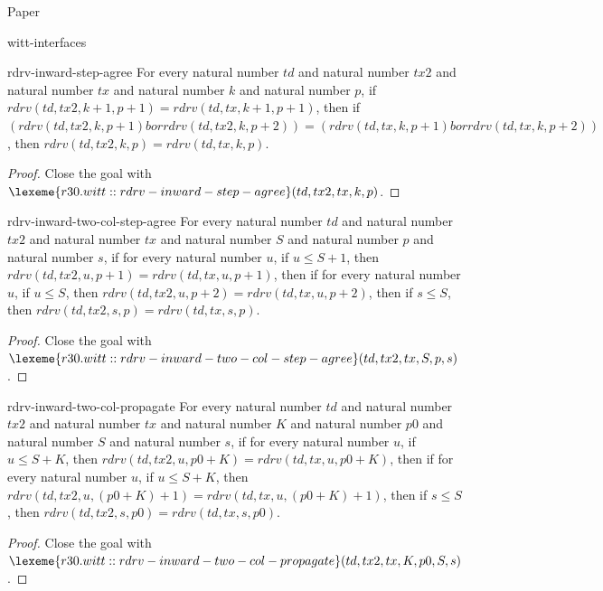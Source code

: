 \begin{lexlean}{Paper}
\begin{section}{witt-interfaces}
  \begin{theorem}{rdrv-inward-step-agree}
  For every natural number \(td\) and natural number \(tx2\) and natural number \(tx\) and natural number \(k\) and natural number \(p\), if \(rdrv(td, tx2, k + 1, p + 1) = rdrv(td, tx, k + 1, p + 1)\), then if \((rdrv(td, tx2, k, p + 1) bor rdrv(td, tx2, k, p + 2)) = (rdrv(td, tx, k, p + 1) bor rdrv(td, tx, k, p + 2))\), then \(rdrv(td, tx2, k, p) = rdrv(td, tx, k, p)\).
  \begin{proof}
  Close the goal with \(\lexeme{r30.witt::rdrv-inward-step-agree}(td, tx2, tx, k, p)\).
  \end{proof}
  \end{theorem}

  \begin{theorem}{rdrv-inward-two-col-step-agree}
  For every natural number \(td\) and natural number \(tx2\) and natural number \(tx\) and natural number \(S\) and natural number \(p\) and natural number \(s\), if for every natural number \(u\), if \(u ≤ S + 1\), then \(rdrv(td, tx2, u, p + 1) = rdrv(td, tx, u, p + 1)\), then if for every natural number \(u\), if \(u ≤ S\), then \(rdrv(td, tx2, u, p + 2) = rdrv(td, tx, u, p + 2)\), then if \(s ≤ S\), then \(rdrv(td, tx2, s, p) = rdrv(td, tx, s, p)\).
  \begin{proof}
  Close the goal with \(\lexeme{r30.witt::rdrv-inward-two-col-step-agree}(td, tx2, tx, S, p, s)\).
  \end{proof}
  \end{theorem}

  \begin{theorem}{rdrv-inward-two-col-propagate}
  For every natural number \(td\) and natural number \(tx2\) and natural number \(tx\) and natural number \(K\) and natural number \(p0\) and natural number \(S\) and natural number \(s\), if for every natural number \(u\), if \(u ≤ S + K\), then \(rdrv(td, tx2, u, p0 + K) = rdrv(td, tx, u, p0 + K)\), then if for every natural number \(u\), if \(u ≤ S + K\), then \(rdrv(td, tx2, u, (p0 + K) + 1) = rdrv(td, tx, u, (p0 + K) + 1)\), then if \(s ≤ S\), then \(rdrv(td, tx2, s, p0) = rdrv(td, tx, s, p0)\).
  \begin{proof}
  Close the goal with \(\lexeme{r30.witt::rdrv-inward-two-col-propagate}(td, tx2, tx, K, p0, S, s)\).
  \end{proof}
  \end{theorem}


\end{section}
\end{lexlean}
